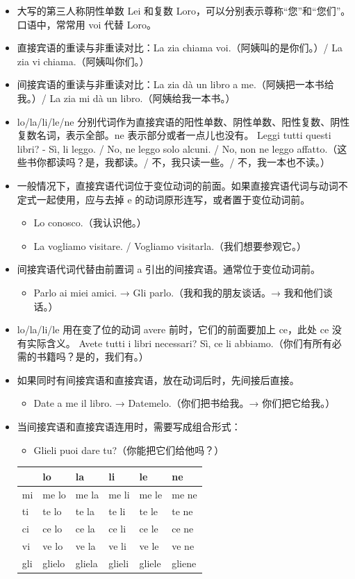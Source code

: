 \documentclass[UTF8,a4paper,titlepage,10pt]{report}
\begin{document}
\begin{enumerate}
\begin{itemize}
\item 大写的第三人称阴性单数 Lei 和复数 Loro，可以分别表示尊称“您”和“您们”。口语中，常常用 voi 代替 Loro。
\item 直接宾语的重读与非重读对比：La zia chiama voi.（阿姨叫的是你们。）/ La zia vi chiama.（阿姨叫你们。）
\item 间接宾语的重读与非重读对比：La zia dà un libro a me.（阿姨把一本书给我。）/ La zia mi dà un libro.（阿姨给我一本书。）
\item lo/la/li/le/ne 分别代词作为直接宾语的阳性单数、阴性单数、阳性复数、阴性复数名词，表示全部。ne 表示部分或者一点儿也没有。
Leggi tutti questi libri? - Sì, li leggo. / No, ne leggo solo alcuni. / No, non ne leggo affatto.（这些书你都读吗？是，我都读。/ 不，我只读一些。/ 不，我一本也不读。）
\item 一般情况下，直接宾语代词位于变位动词的前面。如果直接宾语代词与动词不定式一起使用，应与去掉 e 的动词原形连写，或者置于变位动词前。
\begin{itemize}
\item Lo conosco.（我认识他。）
\item La vogliamo visitare. / Vogliamo visitarla.（我们想要参观它。）
\end{itemize}
\item 间接宾语代词代替由前置词 a 引出的间接宾语。通常位于变位动词前。
\begin{itemize}
\item Parlo ai miei amici. → Gli parlo.（我和我的朋友谈话。→ 我和他们谈话。）
\end{itemize}
\item lo/la/li/le 用在变了位的动词 avere 前时，它们的前面要加上 ce，此处 ce 没有实际含义。
Avete tutti i libri necessari? Sì, ce li abbiamo.（你们有所有必需的书籍吗？是的，我们有。）
\item 如果同时有间接宾语和直接宾语，放在动词后时，先间接后直接。
\begin{itemize}
\item Date a me il libro. → Datemelo.（你们把书给我。→ 你们把它给我。）
\end{itemize}
\item 当间接宾语和直接宾语连用时，需要写成组合形式：
\begin{itemize}
\item Glieli puoi dare tu?（你能把它们给他吗？）
\end{itemize}
\begin{center}
\begin{tabular}{llllll}
 & lo & la & li & le & ne\\
\hline
mi & me lo & me la & me li & me le & me ne\\
ti & te lo & te la & te li & te le & te ne\\
ci & ce lo & ce la & ce li & ce le & ce ne\\
vi & ve lo & ve la & ve li & ve le & ve ne\\
gli & glielo & gliela & glieli & gliele & gliene\\
\end{tabular}
\end{center}
\end{itemize}


\end{enumerate}
\end{document}
